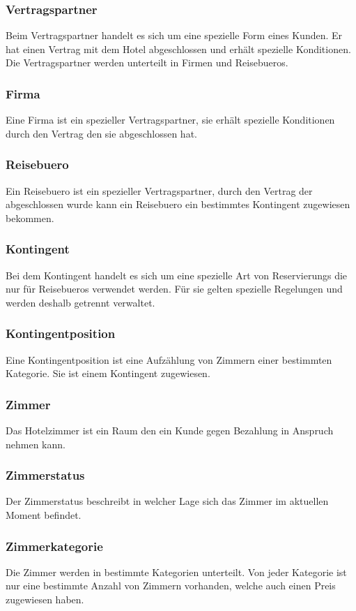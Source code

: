 \documentclass[10pt,a4paper,titlepage]{article}
\begin{document}
\subsubsection{\Gls{Vertragspartner}}
Beim \Gls{Vertragspartner} handelt es sich um eine spezielle Form eines \Gls{Kunde}n.
Er hat einen Vertrag mit dem Hotel abgeschlossen und erhält spezielle Konditionen. Die \Gls{Vertragspartner} werden unterteilt in Firmen und \Glspl{Reisebuero}.
\subsubsection{Firma}
Eine Firma ist ein spezieller \Gls{Vertragspartner}, sie erhält spezielle Konditionen
durch den Vertrag den sie abgeschlossen hat.
\subsubsection{\Gls{Reisebuero}}
Ein \Gls{Reisebuero} ist ein spezieller \Gls{Vertragspartner}, durch den Vertrag der
abgeschlossen wurde kann ein \Gls{Reisebuero} ein bestimmtes \Gls{Kontingent}
zugewiesen bekommen.
\subsubsection{\Gls{Kontingent}}
Bei dem \Gls{Kontingent} handelt es sich um eine spezielle Art von \Glspl{Reservierung} die nur für \Glspl{Reisebuero} verwendet werden. Für sie gelten spezielle Regelungen und werden deshalb getrennt verwaltet.
\subsubsection{Kontingentposition}
Eine Kontingentposition ist eine Aufzählung von \Gls{Zimmer}n einer bestimmten
Kategorie. Sie ist einem \Gls{Kontingent} zugewiesen.
\subsubsection{\Gls{Zimmer}}
Das Hotelzimmer ist ein Raum den ein Kunde gegen Bezahlung in Anspruch nehmen kann.
\subsubsection{Zimmerstatus}
Der Zimmerstatus beschreibt in welcher Lage sich das \Gls{Zimmer} im aktuellen Moment befindet.
\subsubsection{Zimmerkategorie}
Die \Gls{Zimmer} werden in bestimmte Kategorien unterteilt. Von jeder Kategorie ist
nur eine bestimmte Anzahl von \Gls{Zimmer}n vorhanden, welche auch einen Preis
zugewiesen haben.
\end{document}
